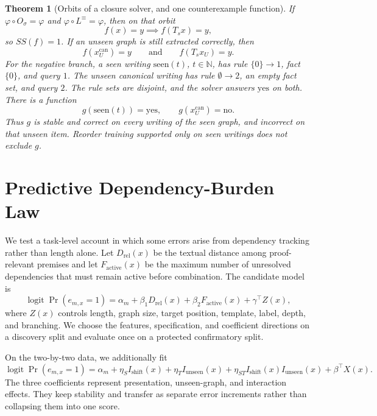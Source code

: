 \documentclass[11pt,a4paper]{article}
\theoremstyle{plain}
\newtheorem{theorem}{Theorem}
\begin{document}
\begin{theorem}[Orbits of a closure solver, and one counterexample function]
\label{thm:main-en}
If $\varphi\circ O_\sigma=\varphi$ and $\varphi\circ L^{\equiv}=\varphi$, then
on that orbit
\begin{equation}
f(x)=y\implies f(T_sx)=y,
\end{equation}
so $SS(f)=1$. If an unseen graph is still extracted correctly, then
\begin{equation}
f(x_U^{\mathrm{can}})=y
\qquad\text{and}\qquad
f(T_sx_U)=y.
\end{equation}
For the negative branch, a seen writing $\mathrm{seen}(t)$, $t\in\mathbb{N}$,
has rule $\{0\}\to 1$, fact $\{0\}$, and query $1$. The unseen canonical
writing has rule $\emptyset\to 2$, an empty fact set, and query $2$. The rule
sets are disjoint, and the solver answers $\mathrm{yes}$ on both. There is a
function
\begin{equation}
g(\mathrm{seen}(t))=\mathrm{yes},
\qquad
g(x_U^{\mathrm{can}})=\mathrm{no}.
\end{equation}
Thus $g$ is stable and correct on every writing of the seen graph, and
incorrect on that unseen item. Reorder training supported only on seen
writings does not exclude $g$.
\end{theorem}

\section{Predictive Dependency-Burden Law}

We test a task-level account in which some errors arise from dependency
tracking rather than length alone. Let $D_{\mathrm{rel}}(x)$ be the textual
distance among proof-relevant premises and let $F_{\mathrm{active}}(x)$ be the
maximum number of unresolved dependencies that must remain active before
combination. The candidate model is
\begin{equation}
\operatorname{logit}\Pr(e_{m,x}=1)
=\alpha_m+\beta_1D_{\mathrm{rel}}(x)
+\beta_2F_{\mathrm{active}}(x)+\gamma^\top Z(x),
\end{equation}
where $Z(x)$ controls length, graph size, target position, template, label,
depth, and branching. We choose the features, specification, and coefficient
directions on a discovery split and evaluate once on a protected confirmatory
split.

On the two-by-two data, we additionally fit
\begin{equation}
\operatorname{logit}\Pr(e_{m,x}=1)
=\alpha_m+\eta_S I_{\mathrm{shift}}(x)
+\eta_T I_{\mathrm{unseen}}(x)
+\eta_{ST}I_{\mathrm{shift}}(x)I_{\mathrm{unseen}}(x)
+\beta^\top X(x).
\end{equation}
The three coefficients represent presentation, unseen-graph, and interaction
effects. They keep stability and transfer as separate error increments rather
than collapsing them into one score.
\end{document}
